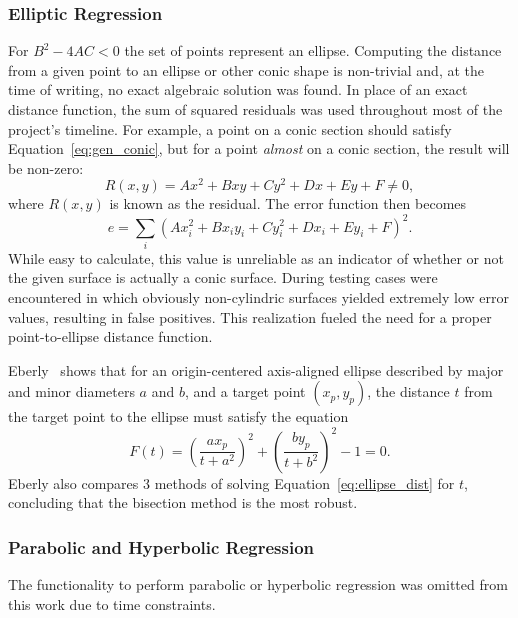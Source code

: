 \subsubsection{Elliptic Regression}\label{sec:elliptic_reg}
For $B^2 - 4AC < 0$ the set of points represent an ellipse.
Computing the distance from a given point to an ellipse or other conic shape is non-trivial and, at the time of writing, no exact algebraic solution was found.
In place of an exact distance function, the sum of squared residuals was used throughout most of the project's timeline.
For example, a point on a conic section should satisfy Equation~\ref{eq:gen_conic}, but for a point \textit{almost} on a conic section, the result will be non-zero:
\begin{equation}
	R(x,y) = Ax^2 + Bxy + Cy^2 + Dx + Ey + F \neq 0,
\end{equation}
where $R(x,y)$ is known as the residual. The error function then becomes
\begin{equation}
	e = \sum_i \left(Ax_i^2 + Bx_i y_i + Cy_i^2 + Dx_i + Ey_i + F\right)^2.
\end{equation}
While easy to calculate, this value is unreliable as an indicator of whether or not the given surface is actually a conic surface.
During testing cases were encountered in which obviously non-cylindric surfaces yielded extremely low error values, resulting in false positives.
This realization fueled the need for a proper point-to-ellipse distance function.

Eberly~\cite{GeoTools_pt_to_ellipse} shows that for an origin-centered axis-aligned ellipse described by major and minor diameters $a$ and $b$, and a target point $(x_p, y_p)$, the distance $t$ from the target point to the ellipse must satisfy the equation
\begin{equation}\label{eq:ellipse_dist}
	F(t) = \left(\frac{a x_p}{t + a^2}\right)^2 + \left(\frac{b y_p}{t + b^2}\right)^2 - 1 = 0.
\end{equation}
Eberly also compares 3 methods of solving Equation~\ref{eq:ellipse_dist} for $t$, concluding that the bisection method is the most robust.

\subsubsection{Parabolic and Hyperbolic Regression}
The functionality to perform parabolic or hyperbolic regression was omitted from this work due to time constraints.

